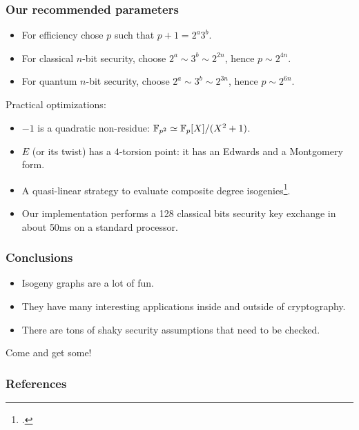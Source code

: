 \documentclass{beamer}
\begin{document}
\begin{frame}
  \frametitle{Our recommended parameters}
  
  \begin{itemize}
  \item For efficiency chose $p$ such that \alert{$p+1 = 2^a3^b$}.
  \item For classical $n$-bit security, choose \alert{$2^a\sim3^b\sim2^{2n}$}, hence \alert{$p\sim2^{4n}$}.
  \item For quantum $n$-bit security, choose \alert{$2^a\sim3^b\sim2^{3n}$}, hence \alert{$p\sim2^{6n}$}.
  \end{itemize}

  \begin{block}{Practical optimizations:}
    \begin{itemize}
    \item $-1$ is a quadratic non-residue: \alert{$\mathbb{F}_{p^2}\simeq\mathbb{F}_p[X]/(X^2+1)$}.
    \item $E$ (or its twist) has a $4$-torsion point: it has an
      \alert{Edwards} and a \alert{Montgomery} form.
    \item A quasi-linear strategy to evaluate composite degree
      isogenies\footcite{defeo+jao+plut12}.
    \item Our implementation performs a 128 classical bits security
      key exchange in about \alert{50ms on a standard processor}.
    \end{itemize}
  \end{block}
\end{frame}


\begin{frame}
  \frametitle{Conclusions}

  \begin{itemize}
  \item Isogeny graphs are a lot of fun.
  \item They have many interesting applications inside and outside of
    cryptography.
  \item There are tons of shaky security assumptions that need to be
    checked.
  \end{itemize}

  \begin{center}
    \large
    Come and get some!
  \end{center}
\end{frame}


\begin{frame}[allowframebreaks]
  \frametitle{References}


  \beamertemplatebookbibitems
  \printbibliography[filter=books]
  \beamertemplatearticlebibitems
  \printbibliography[filter=articles]
\end{frame}
\end{document}
